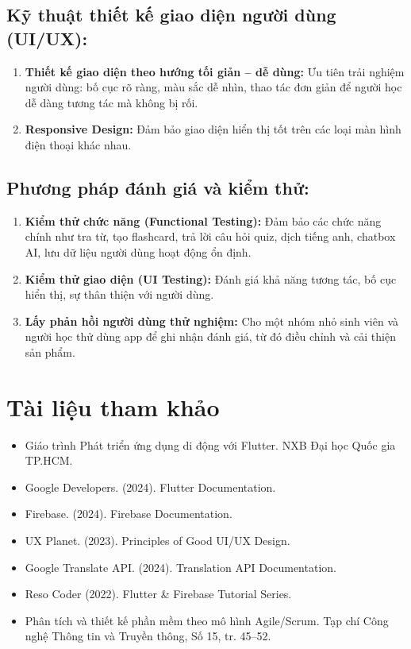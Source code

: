     \subsection{Kỹ thuật thiết kế giao diện người dùng (UI/UX):} 
    \begin{enumerate}
    
    \item \textbf{Thiết kế giao diện theo hướng tối giản – dễ dùng:} Ưu tiên trải nghiệm người dùng: bố cục rõ ràng, màu sắc dễ nhìn, thao tác đơn giản để người học dễ dàng tương tác mà không bị rối.
    \item \textbf{Responsive Design:} Đảm bảo giao diện hiển thị tốt trên các loại màn hình điện thoại khác nhau.
    \end{enumerate}
    
    \subsection{Phương pháp đánh giá và kiểm thử:} 
    \begin{enumerate}

    \item \textbf{Kiểm thử chức năng (Functional Testing):} Đảm bảo các chức năng chính như tra từ, tạo flashcard, trả lời câu hỏi quiz, dịch tiếng anh, chatbox AI, lưu dữ liệu người dùng hoạt động ổn định.
    \item \textbf{Kiểm thử giao diện (UI Testing):} Đánh giá khả năng tương tác, bố cục hiển thị, sự thân thiện với người dùng.
    \item \textbf{Lấy phản hồi người dùng thử nghiệm:} Cho một nhóm nhỏ sinh viên và người học thử dùng app để ghi nhận đánh giá, từ đó điều chỉnh và cải thiện sản phẩm.

\end{enumerate}
\section{ Tài liệu tham khảo}
\begin{itemize}
    \item \textbf{ }Giáo trình Phát triển ứng dụng di động với Flutter. NXB Đại học Quốc gia TP.HCM.
    \item \textbf{ }Google Developers. (2024). Flutter Documentation.
    \item \textbf{ }Firebase. (2024). Firebase Documentation.
   \item \textbf{ }UX Planet. (2023). Principles of Good UI/UX Design.
   \item \textbf{ }Google Translate API. (2024). Translation API Documentation. 
    \item \textbf{ }Reso Coder (2022). Flutter & Firebase Tutorial Series.
    \item \textbf{ }Phân tích và thiết kế phần mềm theo mô hình Agile/Scrum. Tạp chí Công nghệ Thông tin và Truyền thông, Số 15, tr. 45–52.

    \end{itemize}


\setcounter{section}{0}
\newpage

